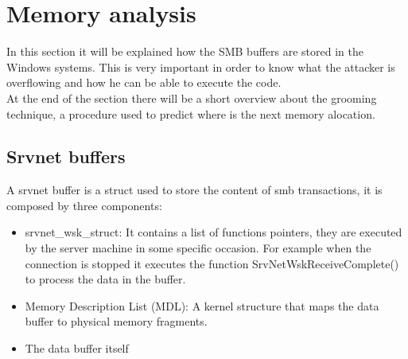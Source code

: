 \section{Memory analysis}
In this section it will be explained how the SMB buffers are stored in the Windows systems. This is very important in order to know 
what the attacker is overflowing and how he can be able to execute the code.\\
At the end of the section there will be a short overview about the grooming technique, a procedure used to predict where is the next memory alocation.
\subsection{Srvnet buffers}
A srvnet buffer is a struct used to store the content of smb transactions, it is composed by three components:
\begin{itemize}
    \item srvnet\_wsk\_struct: It contains a list of functions pointers, they are executed by the server machine in some specific occasion. For example
    when the connection is stopped it executes the function SrvNetWskReceiveComplete() to process the data in the buffer.
    \item Memory Description List (MDL): A kernel structure that maps the data buffer to physical memory fragments.
    \item The data buffer itself
\end{itemize}

